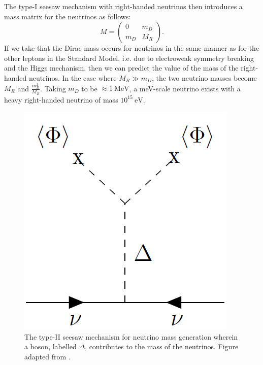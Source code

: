 The type-I seesaw mechanism with right-handed neutrinos then introduces a mass matrix for the neutrinos as follows:
\begin{equation}
M =\begin{pmatrix}
0 & m_D \\
m_D & M_R
\end{pmatrix}.
\end{equation}
If we take that the Dirac mass occurs for neutrinos in the same manner as for the other leptons in the Standard Model, i.e. due to electroweak symmetry breaking and the Higgs mechanism, then we can predict the value of the mass of the right-handed neutrinos.
In the case where $M_R \gg m_D$, the two neutrino masses become $M_R$ and $\frac{m_D^2}{M_R}$.
Taking $m_D$ to be $\approx1~\textrm{MeV}$, a meV-scale neutrino exists with a heavy right-handed neutrino of mass $10^{15}~\textrm{eV}$.

\begin{figure}[tbph]
    \centering
\includegraphics[width=0.40\linewidth]{Figures/TypeIISeesaw.png}
    \caption[Type-II seesaw mechanism.]
    {The type-II seesaw mechanism for neutrino mass generation wherein a boson, labelled $\Delta$, contributes to the mass of the neutrinos.
    Figure adapted from \cite{MIRANDA2016436}.}
    \label{fig:TypeIISeesawMechanism}
\end{figure}


